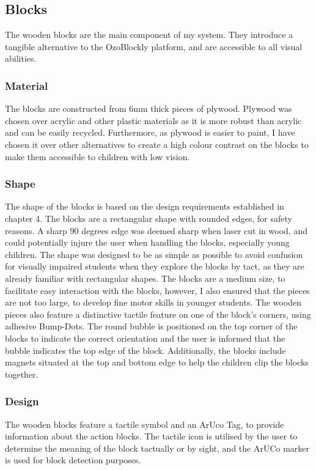 \documentclass[oneside,%
                    author={Malak Hajji},
                    degree={BSc},
                    title={Designing An Accessible Computational Toolkit For Students},
                  subtitle={With Mixed Visual Abilities}]{dissertation}
\begin{document}
\subsection{Blocks}
The wooden blocks are the main component of my system. They introduce a tangible alternative to the OzoBlockly platform, and are accessible to all visual abilities.
\subsubsection{Material}
The blocks are constructed from 6mm thick pieces of plywood. Plywood was chosen over acrylic and other plastic materials as it is more robust than acrylic and can be easily recycled. Furthermore, as plywood is easier to paint, I have chosen it over other alternatives to create a high colour contrast on the blocks to make them accessible to children with low vision.
\subsubsection{Shape}
The shape of the blocks is based on the design requirements established in chapter 4. The blocks are a rectangular shape with rounded edges, for safety reasons. A sharp 90 degrees edge was deemed sharp when laser cut in wood, and could potentially injure the user when handling the blocks, especially young children. The shape was designed to be as simple as possible to avoid confusion for visually impaired students when they explore the blocks by tact, as they are already familiar with rectangular shapes. The blocks are a medium size, to facilitate easy interaction with the blocks, however, I also ensured that the pieces are not too large, to develop fine motor skills in younger students. The wooden pieces also feature a distinctive tactile feature on one of the block’s corners, using adhesive Bump-Dots. The round bubble is positioned on the top corner of the blocks to indicate the correct orientation and the user is informed that the bubble indicates the top edge of the block. Additionally, the blocks include magnets situated at the top and bottom edge to help the children clip the blocks together.

\subsubsection{Design}
The wooden blocks feature a tactile symbol and an ArUco Tag, to provide information about the action blocks. The tactile icon is utilised by the user to determine the meaning of the block tactually or by sight, and the ArUCo marker is used for block detection purposes. 
\end{document}
